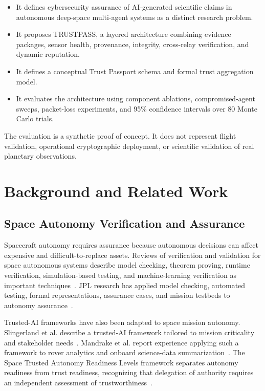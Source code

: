 \documentclass[10pt,conference]{IEEEtran}
\begin{document}
\begin{itemize}
  \item It defines cybersecurity assurance of AI-generated scientific claims in autonomous deep-space multi-agent systems as a distinct research problem.
  \item It proposes TRUSTPASS, a layered architecture combining evidence packages, sensor health, provenance, integrity, cross-relay verification, and dynamic reputation.
  \item It defines a conceptual Trust Passport schema and formal trust aggregation model.
  \item It evaluates the architecture using component ablations, compromised-agent sweeps, packet-loss experiments, and 95\% confidence intervals over 80 Monte Carlo trials.
\end{itemize}

The evaluation is a synthetic proof of concept. It does not represent flight validation, operational cryptographic deployment, or scientific validation of real planetary observations.

\section{Background and Related Work}
\label{sec:related}

\subsection{Space Autonomy Verification and Assurance}

Spacecraft autonomy requires assurance because autonomous decisions can affect expensive and difficult-to-replace assets. Reviews of verification and validation for space autonomous systems describe model checking, theorem proving, runtime verification, simulation-based testing, and machine-learning verification as important techniques~\cite{cardoso2021review}. JPL research has applied model checking, automated testing, formal representations, assurance cases, and mission testbeds to autonomy assurance~\cite{feather2023assurance,feather2022assurance,prokop2021case}.

Trusted-AI frameworks have also been adapted to space mission autonomy. Slingerland et al. describe a trusted-AI framework tailored to mission criticality and stakeholder needs~\cite{slingerland2022adapting}. Mandrake et al. report experience applying such a framework to rover analytics and onboard science-data summarization~\cite{mandrake2022space}. The Space Trusted Autonomy Readiness Levels framework separates autonomy readiness from trust readiness, recognizing that delegation of authority requires an independent assessment of trustworthiness~\cite{hobbs2023starl}.
\end{document}
